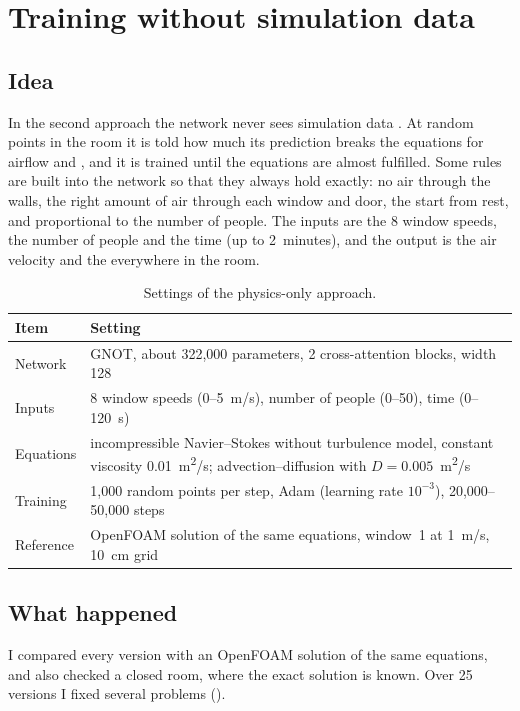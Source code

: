 \chapter{Training without simulation data}
\label{ch:pinn}

\section{Idea}
In the second approach the network never sees simulation data \citep{raissi2019,li2021pino}. At random points in
the room it is told how much its prediction breaks the equations for airflow and \cotwo{}, and it is trained until
the equations are almost fulfilled. Some rules are built into the network so that they always hold exactly: no air
through the walls, the right amount of air through each window and door, the start from rest, and \cotwo{}
proportional to the number of people. The inputs are the 8 window speeds, the number of people and the time (up to
2~minutes), and the output is the air velocity and the \cotwo{} everywhere in the room.

\begin{table}[h]
  \centering
  \caption{Settings of the physics-only approach.}
  \label{tab:pinn}
  \begin{tabular}{>{\raggedright}p{4cm}p{9.7cm}}
    \toprule
    Item & Setting\\
    \midrule
    Network & GNOT, about 322,000 parameters, 2 cross-attention blocks, width 128\\
    Inputs & 8 window speeds (0--5~m/s), number of people (0--50), time (0--120~s)\\
    Equations & incompressible Navier--Stokes without turbulence model, constant viscosity 0.01~m\textsuperscript{2}/s;
                \cotwo{} advection--diffusion with $D=0.005$~m\textsuperscript{2}/s\\
    Training & 1,000 random points per step, Adam (learning rate $10^{-3}$), 20,000--50,000 steps\\
    Reference & OpenFOAM solution of the same equations, window~1 at 1~m/s, 10~cm grid\\
    \bottomrule
  \end{tabular}
\end{table}

\section{What happened}
I compared every version with an OpenFOAM solution of the same equations, and also checked a closed room, where
the exact \cotwo{} solution is known. Over 25 versions I fixed several problems ().

